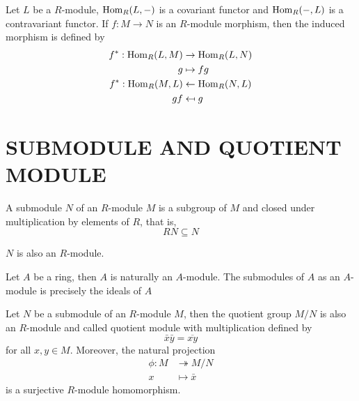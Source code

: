 \begin{remark}
	Let $L$ be a $R$-module, $\operatorname{Hom}_R(L, -)$ is a covariant functor and $\operatorname{Hom}_R(-, L)$ is a contravariant functor. If $f: M \to N$ is an $R$-module morphism, then the induced morphism is defined by
	\begin{align*}
		f^*: \operatorname{Hom}_R(L, M) &\rightarrow \operatorname{Hom}_R(L, N) \\
					g &\mapsto fg \\
		f^*: \operatorname{Hom}_R(M, L) &\leftarrow \operatorname{Hom}_R(N, L) \\
					gf &\mapsfrom g 
	\end{align*}
	\begin{center}
	\end{center}
\end{remark}

\section{SUBMODULE AND QUOTIENT MODULE}

\begin{definition}[submodule]
	A submodule $N$ of an $R$-module $M$ is a subgroup of $M$ and closed under multiplication by elements of $R$, that is,
	$$
		R N \subseteq N
	$$
	
	$N$ is also an $R$-module.
\end{definition}

\begin{remark}
	Let $A$ be a ring, then $A$ is naturally an $A$-module. The submodules of $A$ as an $A$-module is precisely the ideals of $A$
\end{remark}

\begin{definition}
	Let $N$ be a submodule of an $R$-module $M$, then the quotient group $M / N$ is also an $R$-module and called quotient module with multiplication defined by
	$$
		\bar{x}\bar{y} = \overline{xy}
	$$
	for all $x, y \in M$. Moreover, the natural projection
	\begin{align*}
		\phi: M &\twoheadrightarrow M / N \\
				x &\mapsto \bar{x}
	\end{align*}
	is a surjective $R$-module homomorphism.
\end{definition}

